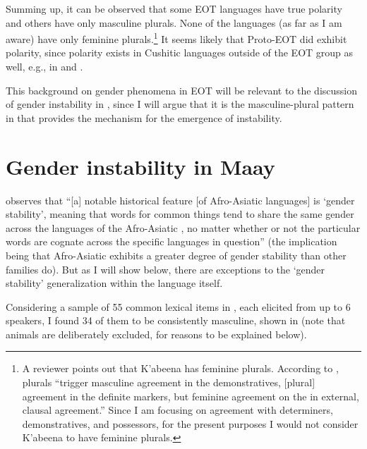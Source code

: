 \documentclass[output=paper,modfonts]{langscibook}
\begin{document}
Summing up, it can be observed that some EOT languages have true polarity and others have only masculine plurals. None of the languages (as far as I am aware) have only feminine plurals.\footnote{A reviewer points out that K’abeena has feminine plurals. According to \citet[143]{Mous2008}, plurals “trigger masculine agreement in the demonstratives, [plural] agreement in the definite markers, but feminine agreement on the  in external, clausal agreement.” Since I am focusing on agreement with determiners, demonstratives, and possessors, for the present purposes I would not consider K’abeena to have feminine plurals.} It seems likely that Proto-EOT did exhibit polarity, since polarity exists in Cushitic languages outside of the EOT group as well, e.g., in  \citep{Andrzejewski1960} and  \citep{Wolff2014}. 

This background on gender phenomena in EOT will be relevant to the discussion of gender instability in , since I will argue that it is the masculine-plural pattern in  that provides the mechanism for the emergence of instability.

\section{Gender instability in Maay}\label{sec:paster:4}

\citet{Wolff2014} observes that “[a] notable historical feature [of Afro-Asiatic languages] is ‘gender stability’, meaning that words for common things tend to share the same gender across the languages of the Afro-Asiatic , no matter whether or not the particular words are cognate across the specific languages in question” (the implication being that Afro-Asiatic exhibits a greater degree of gender stability than other families do). But as I will show below, there are exceptions to the ‘gender stability’ generalization within the  language itself. 

Considering a sample of 55 common lexical items in , each elicited from up to 6 speakers, I found 34 of them to be consistently masculine, shown in  (note that animals are deliberately excluded, for reasons to be explained below).
\end{document}
